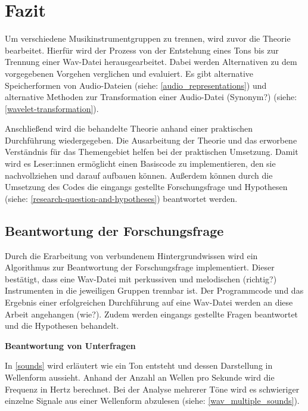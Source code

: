 \chapter{Fazit}
%

Um verschiedene Musikinstrumentgruppen zu trennen, wird zuvor die Theorie bearbeitet.
Hierfür wird der Prozess von der Entstehung eines Tons bis zur Trennung einer Wav-Datei herausgearbeitet.
Dabei werden Alternativen zu dem vorgegebenen Vorgehen verglichen und evaluiert.
Es gibt alternative Speicherformen von Audio-Dateien (siehe: \cref{audio_representations}) und alternative Methoden zur Transformation einer Audio-Datei (Synonym?) (siehe: \cref{wavelet-transformation}).

\par

Anschließend wird die behandelte Theorie anhand einer praktischen Durchführung wiedergegeben.
Die Ausarbeitung der Theorie und das erworbene Verständnis für das Themengebiet helfen bei der praktischen Umsetzung.
Damit wird es Leser:innen ermöglicht einen Basiscode zu implementieren, den sie nachvollziehen und darauf aufbauen können.
Außerdem können durch die Umsetzung des Codes die eingangs gestellte Forschungsfrage und Hypothesen (siehe: \cref{research-question-and-hypotheses}) beantwortet werden.

%
\section{Beantwortung der Forschungsfrage}
%

Durch die Erarbeitung von verbundenem Hintergrundwissen wird ein Algorithmus zur Beantwortung der Forschungsfrage implementiert.
Dieser bestätigt, dass eine Wav-Datei mit perkussiven und melodischen (richtig?) Instrumenten in die jeweiligen Gruppen trennbar ist.
Der Programmcode und das Ergebnis einer erfolgreichen Durchführung auf eine Wav-Datei werden an diese Arbeit angehangen (wie?).
Zudem werden eingangs gestellte Fragen beantwortet und die Hypothesen behandelt.

%
\textbf{Beantwortung von Unterfragen}
%

In \cref{sounds} wird erläutert wie ein Ton entsteht und dessen Darstellung in Wellenform aussieht.
Anhand der Anzahl an Wellen pro Sekunde wird die Frequenz in Hertz berechnet.
Bei der Analyse mehrerer Töne wird es schwieriger einzelne Signale aus einer Wellenform abzulesen (siehe: \cref{wav_multiple_sounds}).

\par

